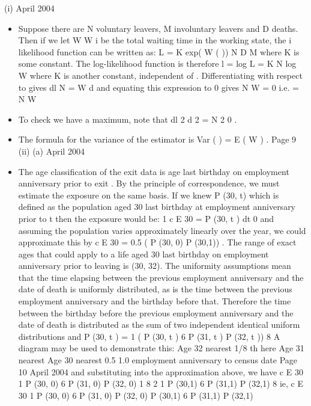 \documentclass[a4paper,12pt]{article}
\begin{document}
(i)
April 2004
\begin{itemize}
\item Suppose there are N voluntary leavers, M involuntary leavers and D deaths.
Then if we let W
W i be the total waiting time in the working state, the
i
likelihood function can be written as:
L = K exp( W (
))
N
D
M
where K is some constant. The log-likelihood function is therefore
l = log L = K
N log
W
where K is another constant, independent of . Differentiating with respect
to gives
dl N
=
W
d
and equating this expression to 0 gives
N
W = 0 i.e.
=
N
W
\item To check we have a maximum, note that
dl 2
d
2
=
N
2
0 .
\item The formula for the variance of the estimator is
Var ( ) =
E ( W )
.
Page 9 %
(ii)
(a)
April 2004
\item The age classification of the exit data is age last birthday on
employment anniversary prior to exit . By the principle of
correspondence, we must estimate the exposure on the same basis. If
we knew P (30, t) which is defined as the population aged 30 last
birthday at employment anniversary prior to t then the exposure would
be:
1
c
E 30
= P (30, t ) dt
0
and assuming the population varies approximately linearly over the
year, we could approximate this by
c
E 30
= 0.5 ( P (30, 0) P (30,1)) .
The range of exact ages that could apply to a life aged 30 last birthday
on employment anniversary prior to leaving is (30, 32).
The uniformity assumptions mean that the time elapsing between the
previous employment anniversary and the date of death is uniformly
distributed, as is the time between the previous employment
anniversary and the birthday before that. Therefore the time between
the birthday before the previous employment anniversary and the date
of death is distributed as the sum of two independent identical uniform
distributions and
P (30, t ) =
1
( P (30, t ) 6 P (31, t ) P (32, t ))
8
A diagram may be used to demonstrate this:
Age 32
nearest
1/8 th here
Age 31
nearest
Age 30
nearest
0.5
1.0
employment anniversary to census date
Page 10 %
April 2004
and substituting into the approximation above, we have
c
E 30
1
P (30, 0) 6 P (31, 0) P (32, 0)
1 8
2 1
P (30,1) 6 P (31,1) P (32,1)
8
ie,
c
E 30
1
P (30, 0) 6 P (31, 0) P (32, 0) P (30,1) 6 P (31,1) P (32,1)

\end{itemize}
\end{document}
